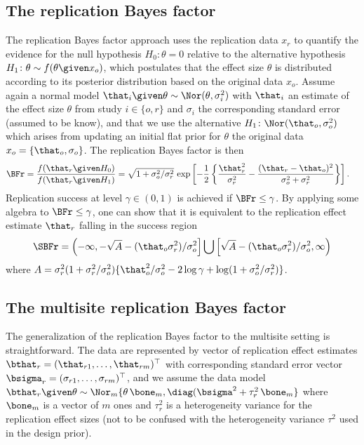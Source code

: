 \begin{subappendices}
\subsection{The replication Bayes factor}
The replication Bayes factor approach uses the replication data $x_{r}$ to
quantify the evidence for the null hypothesis $H_{0}\colon \theta = 0$ relative
to the alternative hypothesis
\mbox{$H_{1} \colon \theta \sim f(\theta \given x_{o})$}, which postulates that
the effect size $\theta$ is distributed according to its posterior distribution
based on the original data $x_{o}$. Assume again a normal model
$\that_{i} \given \theta \sim \Nor(\theta, \sigma^{2}_{i})$ with $\that_{i}$ an
estimate of the effect size $\theta$ from study $i \in \{o, r\}$ and
$\sigma_{i}$ the corresponding standard error (assumed to be know), and that we
use the alternative $H_{1} \colon \Nor(\that_{o}, \sigma^{2}_{o})$ which arises
from updating an initial flat prior for $\theta$ the original data
$x_{o} = \{\that_{o}, \sigma_{o}\}$. The replication Bayes factor is then
\begin{align}
  \label{eq3sup:bfr}
  \BFr &= \frac{f(\that_{r} \given H_{0})}{f(\that_{r} \given H_{1})}
       = \sqrt{1 + \sigma^{2}_{o}/\sigma^{2}_{r}} \, \exp\left[
         -\frac{1}{2}\left\{ \frac{\that^{2}_{r}}{\sigma^{2}_{r}} -
         \frac{(\that_{r} - \that_{o})^{2}}{\sigma^{2}_{o} + \sigma^{2}_{r}}
         \right\}\right].
\end{align}
Replication success at level $\gamma \in (0, 1)$ is achieved if
$\BFr \leq \gamma$. By applying some algebra to $\BFr \leq \gamma$, one can show
that it is equivalent to the replication effect estimate $\that_{r}$ falling in
the success region
\begin{align*}
  \SBFr
  = \left(-\infty, -\sqrt{A} - (\that_{o}\sigma^{2}_{r})/\sigma^{2}_{o}\right] \bigcup
   \left[\sqrt{A} - (\that_{o}\sigma^{2}_{r})/\sigma^{2}_{o}, \infty\right)
\end{align*}
where
$A = \sigma^{2}_{r}(1 + \sigma^{2}_{r}/\sigma^{2}_{o}) \{\that_{o}^{2}/\sigma^{2}_{o} - 2 \log \gamma + \log(1 + \sigma^{2}_{o}/\sigma^{2}_{r})\}$.

\subsection{The multisite replication Bayes factor}
The generalization of the replication Bayes factor to the multisite setting is
straightforward. The data are represented by vector of replication effect
estimates $\bthat_{r} = (\that_{r1}, \dots, \that_{rm})^{\top}$ with
corresponding standard error vector
$\bsigma_{r} = (\sigma_{r1}, \dots, \sigma_{rm})^{\top}$, and we assume the data
model
$\bthat_{r} \given \theta \sim \Nor_{m}\{\theta \, \bone_{m}, \diag(\bsigma^{2} + \tau^{2}_{r} \, \bone_{m}\}$
where $\bone_{m}$ is a vector of $m$ ones and $\tau^{2}_{r}$ is a heterogeneity
variance for the replication effect sizes (not to be confused with the
heterogeneity variance $\tau^{2}$ used in the design prior).


\end{subappendices}
